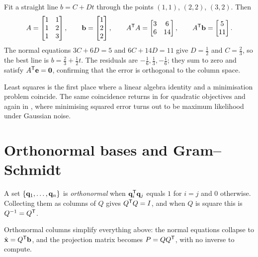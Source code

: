 \begin{example}
Fit a straight line \(b=C+Dt\) through the points \((1,1)\), \((2,2)\),
\((3,2)\). Then
\[
	A=\begin{bmatrix}1&1\\1&2\\1&3\end{bmatrix},
	\qquad
	\mathbf{b}=\begin{bmatrix}1\\2\\2\end{bmatrix},
	\qquad
	A^{\mathsf{T}} A=\begin{bmatrix}3&6\\6&14\end{bmatrix},
	\qquad
	A^{\mathsf{T}}\mathbf{b}=\begin{bmatrix}5\\11\end{bmatrix}.
\]
The normal equations \(3C+6D=5\) and \(6C+14D=11\) give \(D=\tfrac{1}{2}\) and
\(C=\tfrac{2}{3}\), so the best line is \(b=\tfrac{2}{3}+\tfrac{1}{2}t\). The
residuals are \(-\tfrac{1}{6},\tfrac{1}{3},-\tfrac{1}{6}\); they sum to zero and
satisfy \(A^{\mathsf{T}}\mathbf{e}=\mathbf{0}\), confirming that the error is orthogonal to the
column space.
\end{example}

\begin{remark}
Least squares is the first place where a linear algebra identity and a
minimisation problem coincide. The same coincidence returns in
 for quadratic objectives and again in ,
where minimising squared error turns out to be maximum likelihood under Gaussian
noise.
\end{remark}

\section{Orthonormal bases and Gram--Schmidt}

A set \(\{\mathbf{q}_1,\ldots,\mathbf{q}_n\}\) is \emph{orthonormal} when
\(\mathbf{q}_i^{\mathsf{T}}\mathbf{q}_j\) equals \(1\) for \(i=j\) and \(0\) otherwise.
Collecting them as columns of \(Q\) gives \(Q^{\mathsf{T}} Q=I\), and when \(Q\) is square
this is \(Q^{-1}=Q^{\mathsf{T}}\).

Orthonormal columns simplify everything above: the normal equations collapse to
\(\hat{\mathbf{x}}=Q^{\mathsf{T}}\mathbf{b}\), and the projection matrix becomes
\(P=QQ^{\mathsf{T}}\), with no inverse to compute.


